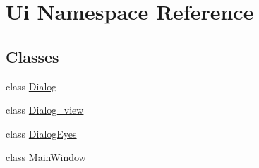 \hypertarget{namespace_ui}{}\section{Ui Namespace Reference}
\label{namespace_ui}
\subsection*{Classes}
\begin{DoxyCompactItemize}
\item 
class \hyperlink{class_ui_1_1_dialog}{Dialog}
\item 
class \hyperlink{class_ui_1_1_dialog__view}{Dialog\+\_\+view}
\item 
class \hyperlink{class_ui_1_1_dialog_eyes}{Dialog\+Eyes}
\item 
class \hyperlink{class_ui_1_1_main_window}{Main\+Window}
\end{DoxyCompactItemize}
